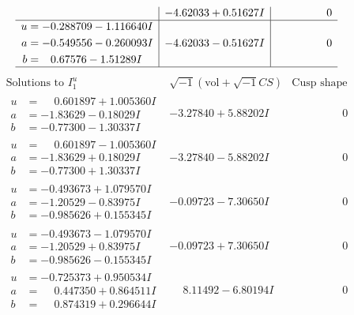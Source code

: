 \documentclass[1p]{elsarticle_modified}
\theoremstyle{definition}
\newcommand{\I}{\sqrt{-1}}
\begin{document}
$$\begin{array}{c|c|c}
 & -4.62033 + 0.51627 I & \phantom{-0.000000 } 0 \\ \hline\begin{aligned}
u &= -0.288709 - 1.116640 I \\
a &= -0.549556 - 0.260093 I \\
b &= \phantom{-}0.67576 - 1.51289 I\end{aligned}
 & -4.62033 - 0.51627 I & \phantom{-0.000000 } 0\\
 \hline 
 \end{array}$$\newpage$$\begin{array}{c|c|c}  
\text{Solutions to }I^u_{1}& \I (\text{vol} + \sqrt{-1}CS) & \text{Cusp shape}\\
 \hline 
\begin{aligned}
u &= \phantom{-}0.601897 + 1.005360 I \\
a &= -1.83629 - 0.18029 I \\
b &= -0.77300 - 1.30337 I\end{aligned}
 & -3.27840 + 5.88202 I & \phantom{-0.000000 } 0 \\ \hline\begin{aligned}
u &= \phantom{-}0.601897 - 1.005360 I \\
a &= -1.83629 + 0.18029 I \\
b &= -0.77300 + 1.30337 I\end{aligned}
 & -3.27840 - 5.88202 I & \phantom{-0.000000 } 0 \\ \hline\begin{aligned}
u &= -0.493673 + 1.079570 I \\
a &= -1.20529 - 0.83975 I \\
b &= -0.985626 + 0.155345 I\end{aligned}
 & -0.09723 - 7.30650 I & \phantom{-0.000000 } 0 \\ \hline\begin{aligned}
u &= -0.493673 - 1.079570 I \\
a &= -1.20529 + 0.83975 I \\
b &= -0.985626 - 0.155345 I\end{aligned}
 & -0.09723 + 7.30650 I & \phantom{-0.000000 } 0 \\ \hline\begin{aligned}
u &= -0.725373 + 0.950534 I \\
a &= \phantom{-}0.447350 + 0.864511 I \\
b &= \phantom{-}0.874319 + 0.296644 I\end{aligned}
 & \phantom{-}8.11492 - 6.80194 I & \phantom{-0.000000 } 0 \\ \hline\begin{aligned}

\end{aligned}
\end{array}$$
\end{document}
